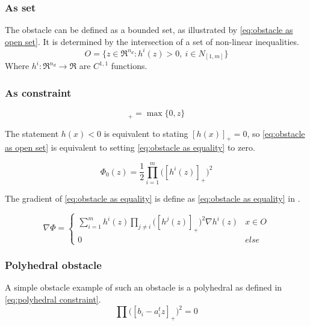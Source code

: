 			\subsubsection{As set}
				 The obstacle can be defined as a bounded set, as illustrated by \eqref{eq:obstacle as open set}. It is determined by the intersection of a set of non-linear inequalities.
				\begin{equation}
					O = \{ z \in \Re^{n_d} : h^i(z)>0,\ i \in N_{[1,m]} \}
					\label{eq:obstacle as open set}
				\end{equation}
				Where $ h^i:\Re^{n_d} \rightarrow \Re $ are $C^{1,1}$ functions.
				
			\subsubsection{As constraint}
				\begin{equation}
					[z]_+ =  \max\{0,z\}
				\end{equation}
				
				The statement $h(x)<0$ is equivalent to stating $[h(x)]_+=0$, so \eqref{eq:obstacle as open set} is equivalent to setting \eqref{eq:obstacle as equality} to zero.
				
				\begin{equation}
					\Phi_0(z) =  \frac{1}{2} \prod_{i=1}^m \Big( [h^i(z)]_+ \Big)^2
					\label{eq:obstacle as equality}
				\end{equation}
				
				The gradient of \eqref{eq:obstacle as equality} is define as \eqref{eq:obstacle as equality} in \cite{AjaySathya2017}.
				
				\begin{equation}
					\nabla \Phi =
					\begin{cases}
						\sum_{i=1}^{m} h^i(z)\prod_{j \ne i} \Big( [h^j(z)]_+ \Big)^2 \nabla h^i(z)
						& x \in O \\
						0 & else
					\end{cases}
					\label{eq:derivative obstacle as equality}
				\end{equation}
			
			\subsubsection{Polyhedral obstacle}
				A simple obstacle example of such an obstacle is a polyhedral as defined in \eqref{eq:polyhedral constraint}.
				\begin{equation}
					\prod \Big([b_i - a_i^t z]_+ \Big)^2 = 0
					\label{eq:polyhedral constraint}
				\end{equation}
			
